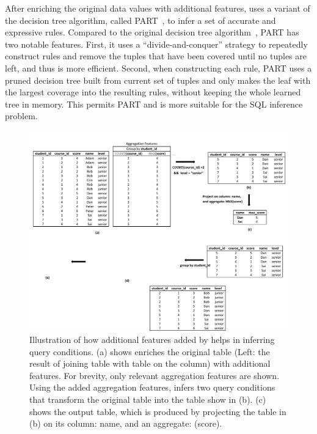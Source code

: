After enriching the original data values with additional features, 
\ourtool uses a variant of the decision tree algorithm, called PART~\cite{Frank:1998},
to infer a set of accurate and expressive rules.
Compared to the original decision tree algorithm~\cite{},
PART has two notable features. 
First, it uses a ``divide-and-conquer'' strategy to repeatedly
construct rules and remove the tuples that have been covered until no tuples are left,
and thus is more efficient.
Second, when constructing each rule, PART uses a pruned decision tree built from
current set of tuples and only makes the leaf with the largest coverage
into the resulting rules, without keeping the whole learned tree in memory.
This permits PART  and is more suitable
for the SQL inference problem.




\begin{figure}[t]
  \centering
  \includegraphics[scale=0.65]{fullexample}
  \vspace*{-5.0ex}\caption {{\label{fig:fullexample}
  Illustration of how additional features added by \ourtool
  helps in inferring query conditions. (a) shows \ourtool
  enriches the original table (Left: the
  result of joining table  with table
   on the  column)
  with additional features. For brevity, only relevant
  aggregation features are shown. Using the added aggregation
  features, \ourtool infers two query conditions that
  transform the original table into the table show in (b).
  (c) shows the output table, which is produced by projecting the
   table in (b)
  on its column: name, and an aggregate: (score).
}}

\end{figure}


